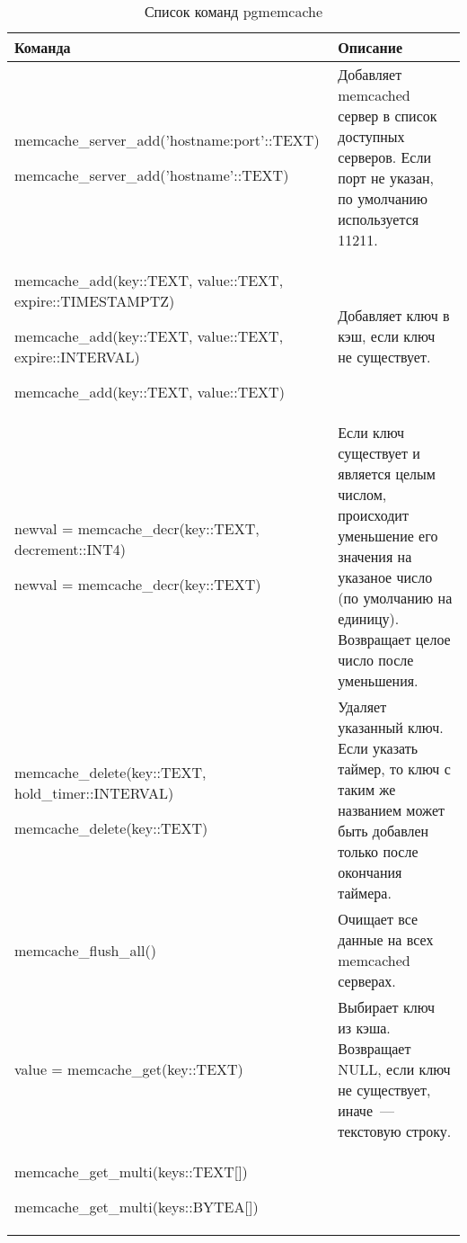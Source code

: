 \begin{table}[h]
\caption{Список команд pgmemcache}
\label{tabular:pgmemcache1}
\begin{tabular}{| >{\raggedright\scriptsize}p{7cm}| >{\scriptsize}p{7cm} |}
\hline
Команда & Описание\\
\hline
memcache\_server\_add('hostname:port'::TEXT) 

memcache\_server\_add('hostname'::TEXT)
& 
Добавляет memcached сервер в список доступных серверов. Если порт не указан, по умолчанию используется 11211.\\

\hline

memcache\_add(key::TEXT, value::TEXT, expire::TIMESTAMPTZ)

memcache\_add(key::TEXT, value::TEXT, expire::INTERVAL)

memcache\_add(key::TEXT, value::TEXT)
& 
Добавляет ключ в кэш, если ключ не существует.\\

\hline

newval = memcache\_decr(key::TEXT, decrement::INT4)

newval = memcache\_decr(key::TEXT)
& 
Если ключ существует и является целым числом, происходит уменьшение 
его значения на указаное число (по умолчанию на единицу). 
Возвращает целое число после уменьшения.\\

\hline

memcache\_delete(key::TEXT, hold\_timer::INTERVAL)

memcache\_delete(key::TEXT)

& 
Удаляет указанный ключ. Если указать таймер, то ключ с таким же названием может
быть добавлен только после окончания таймера.\\

\hline

memcache\_flush\_all()

& 
Очищает все данные на всех memcached серверах.\\

\hline

value = memcache\_get(key::TEXT)

& 
Выбирает ключ из кэша. Возвращает NULL, если ключ не существует, иначе~--- текстовую строку.\\

\hline

memcache\_get\_multi(keys::TEXT[])

memcache\_get\_multi(keys::BYTEA[])


\end{tabular}
\end{table}
